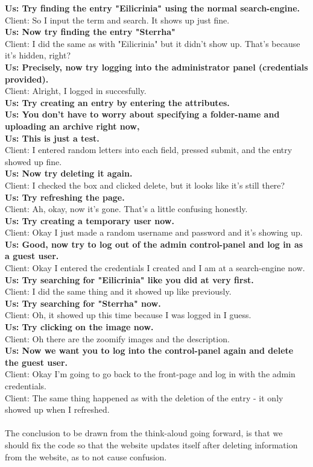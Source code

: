 \documentclass[12pt,a4paper]{article}
\begin{document}
{\bf Us: Try finding the entry "Eilicrinia" using the normal search-engine.}\\
Client: So I input the term and search. It shows up just fine.\\
{\bf Us: Now try finding the entry "Sterrha"}\\
Client: I did the same as with "Eilicrinia" but it didn't show up. That's because it's hidden, right?\\
{\bf Us: Precisely, now try logging into the administrator panel (credentials provided).}\\
Client: Alright, I logged in succesfully.\\
{\bf Us: Try creating an entry by entering the attributes.} \\
{\bf Us: You don't have to worry about specifying a folder-name and uploading an archive right now,} \\
{\bf Us: This is just a test.}\\
Client: I entered random letters into each field, pressed submit, and the entry showed up fine.\\
{\bf Us: Now try deleting it again.}\\
Client: I checked the box and clicked delete, but it looks like it's still there?\\
{\bf Us: Try refreshing the page.}\\
Client: Ah, okay, now it's gone. That's a little confusing honestly.\\
{\bf Us: Try creating a temporary user now.}\\
Client: Okay I just made a random username and password and it's showing up.\\
{\bf Us: Good, now try to log out of the admin control-panel and log in as a guest user.}\\
Client: Okay I entered the credentials I created and I am at a search-engine now.\\
{\bf Us: Try searching for "Eilicrinia" like you did at very first.}\\
Client: I did the same thing and it showed up like previously.\\
{\bf Us: Try searching for "Sterrha" now.}\\
Client: Oh, it showed up this time because I was logged in I guess.\\
{\bf Us: Try clicking on the image now.}\\
Client: Oh there are the zoomify images and the description.\\
{\bf Us: Now we want you to log into the control-panel again and delete the guest user.}\\
Client: Okay I'm going to go back to the front-page and log in with the admin credentials.\\
Client: The same thing happened as with the deletion of the entry - it only showed up when I refreshed.\\
\\
The conclusion to be drawn from the think-aloud going forward, is that we should fix the code so that the website updates itself after deleting information from the website, as to not cause confusion.
\end{document}
